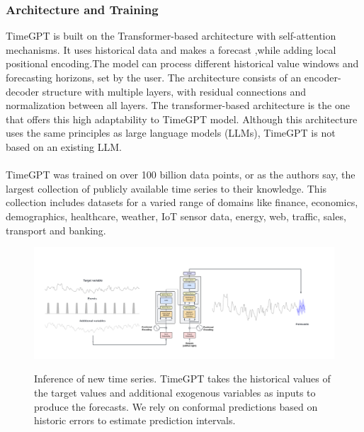 \documentclass{article}
\begin{document}
\subsubsection{Architecture and Training}
TimeGPT is built on the Transformer-based architecture with self-attention mechanisms. It uses historical data and makes a forecast ,while adding local positional encoding.The model can process different historical value windows and forecasting horizons, set by the user. The architecture consists of an encoder-decoder structure with multiple layers, with residual connections and normalization between all layers. The transformer-based architecture is the one that offers this high adaptability to TimeGPT model. Although this architecture uses the same principles as large language models (LLMs), TimeGPT is not based on an existing LLM.\\
\\
TimeGPT was trained on over 100 billion data points, or as the authors say, the largest collection of publicly available time series to their knowledge. This collection includes datasets for a varied range of domains like finance, economics, demographics, healthcare, weather, IoT sensor data, energy, web, traffic, sales, transport and banking. 

\begin{figure}[h]
\includegraphics[width=1\linewidth]{images/timegpt_prediction.png}
    \label{fig:mesh1}
    \caption{Inference of new time series. TimeGPT takes the historical values of the target values and
additional exogenous variables as inputs to produce the forecasts. We rely on conformal predictions
based on historic errors to estimate prediction intervals.\cite{garza2023timegpt1}}
\end{figure}

\newpage
\end{document}
